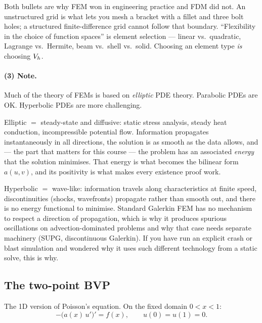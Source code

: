 \begin{mechanics}
Both bullets are why FEM won in engineering practice and FDM did not. An
unstructured grid is what lets you mesh a bracket with a fillet and three bolt
holes; a structured finite-difference grid cannot follow that boundary.
``Flexibility in the choice of function spaces'' is element selection --- linear
vs.\ quadratic, Lagrange vs.\ Hermite, beam vs.\ shell vs.\ solid. Choosing an
element type \emph{is} choosing $V_{h}$.
\end{mechanics}

\paragraph{(3) Note.}
Much of the theory of FEMs is based on \emph{elliptic} PDE theory. Parabolic
PDEs are OK. Hyperbolic PDEs are more challenging.

\begin{intuition}
Elliptic $=$ steady-state and diffusive: static stress analysis, steady heat
conduction, incompressible potential flow. Information propagates
instantaneously in all directions, the solution is as smooth as the data
allows, and --- the part that matters for this course --- the problem has an
associated \emph{energy} that the solution minimises. That energy is what
becomes the bilinear form $a(u,v)$, and its positivity is what makes every
existence proof work.

Hyperbolic $=$ wave-like: information travels along characteristics at finite
speed, discontinuities (shocks, wavefronts) propagate rather than smooth out,
and there is no energy functional to minimise. Standard Galerkin FEM has no
mechanism to respect a direction of propagation, which is why it produces
spurious oscillations on advection-dominated problems and why that case needs
separate machinery (SUPG, discontinuous Galerkin). If you have run an explicit
crash or blast simulation and wondered why it uses such different technology
from a static solve, this is why.
\end{intuition}

\subsection*{The two-point BVP}

The 1D version of Poisson's equation. On the fixed domain $0<x<1$:
\begin{equation}\label{eq:bvp}
  -\bigl(a(x)\,u'\bigr)' = f(x),
  \qquad u(0)=u(1)=0 .
\end{equation}

